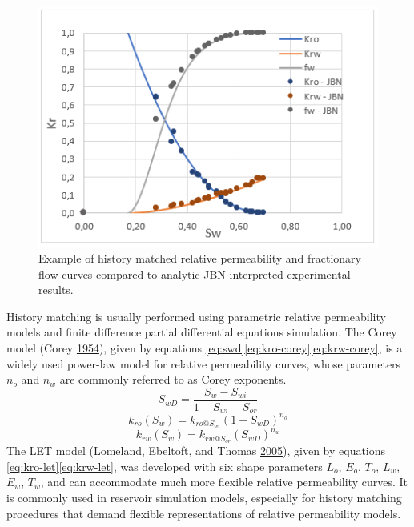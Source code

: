 \documentclass[english,msc,numbers]{coppe}
\begin{document}
  \begin{figure}
  
  {\centering \includegraphics[width=0.7\linewidth]{figure/2-15-krel-JBN} 
  
  }
  
  \caption{Example of history matched relative permeability and fractionary flow curves compared to analytic JBN interpreted experimental results.}\label{fig:krel-JBN}
  \end{figure}
  History matching is usually performed using parametric relative permeability models and finite difference partial differential equations simulation. The Corey model (Corey \protect\hyperlink{ref-Corey1954}{1954}), given by equations \eqref{eq:swd}\eqref{eq:kro-corey}\eqref{eq:krw-corey}, is a widely used power-law model for relative permeability curves, whose parameters \(n_o\) and \(n_w\) are commonly referred to as Corey exponents.
  \begin{equation} 
    S_{wD} = \frac{S_w - S_{wi}}{1 - S_{wi} - S_{or}} 
    \label{eq:swd}
  \end{equation}
  \begin{equation} 
    k_{ro}(S_w) = k_{ro@S_{wi}}(1-S_{wD})^{n_o}
    \label{eq:kro-corey}
  \end{equation}
  \begin{equation} 
    k_{rw}(S_w) = k_{rw@S_{or}}(S_{wD})^{n_w}
    \label{eq:krw-corey}
  \end{equation}
  The LET model (Lomeland, Ebeltoft, and Thomas \protect\hyperlink{ref-Lomeland2005}{2005}), given by equations \eqref{eq:kro-let}\eqref{eq:krw-let}, was developed with six shape parameters \(L_o\), \(E_o\), \(T_o\), \(L_w\), \(E_w\), \(T_w\), and can accommodate much more flexible relative permeability curves. It is commonly used in reservoir simulation models, especially for history matching procedures that demand flexible representations of relative permeability models.
\end{document}
